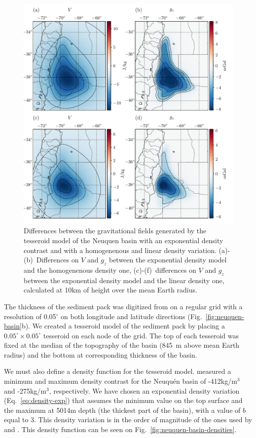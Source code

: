 \documentclass[extra, referee]{gji}
\begin{document}
\begin{figure}
\centering
\includegraphics[width=\linewidth]{figures/neuquen-basin-diffs.pdf}
\caption{
    Differences between the gravitational fields generated by the tesseroid model of the
    Neuquen basin with an exponential density contrast and with a homogenenous and
    linear density variation.
    \mbox{(a)-(b)}~Differences on $V$ and $g_z$ between the exponential density model
    and the homogenenous density one,
    \mbox{(c)-(f)}~differences on $V$ and $g_z$ between the exponential density model
    and the linear density one, calculated at 10km of height over the mean Earth radius.
}
\label{fig:neuquen-basin-diffs}
\end{figure}

The thickness of the sediment pack was digitized from \citet{Heine2007} on a regular
grid with a resolution of 0.05$^\circ$ on both longitude and latitude directions
(Fig.~\ref{fig:neuquen-basin}b).
We created a tesseroid model of the sediment pack by placing a
$0.05^\circ \times 0.05^\circ$ tesseroid on each node of the grid.
The top of each tesseroid was fixed at the median of the topography of the basin
(845~m above mean Earth radius) and the bottom at corresponding thickness of the basin.

We must also define a density function for the tesseroid model.
\citet{Sigismondi2012} measured a minimum and maximum density contrast for
the Neuqu\'en basin of -412kg/m$^3$ and -275kg/m$^3$, respectively.
We have chosen an exponential density variation (Eq.~\ref{eq:density-exp}) that assumes
the minimum value on the top surface and the maximum at 5014m depth (the thickest part
of the basin), with a value of $b$ equal to 3.
This density variation is in the order of magnitude of the ones used by
\citet{Cowie1990} and \citet{Cordell1973}.
This density function can be seen on Fig.~\ref{fig:neuquen-basin-densities}.
\end{document}
